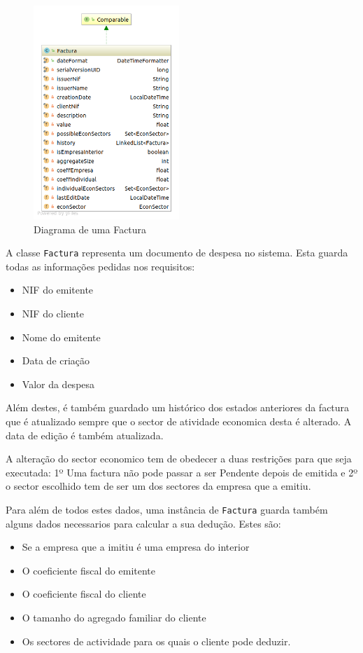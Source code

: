 \documentclass[12pt,a4paper]{report}
\begin{document}
    \begin{figure}
        \includegraphics[width=5.5cm]{./images/Factura.png}
        \caption{Diagrama de uma Factura}\label{fig:Factura}
    \end{figure}

    A classe \texttt{Factura} representa um documento de despesa no
    sistema. Esta guarda todas as informações pedidas nos requisitos:
    \begin{multicols}{2}
        \begin{itemize}
            \item NIF do emitente
            \item NIF do cliente
            \item Nome do emitente
            \item Data de criação
            \item Valor da despesa
        \end{itemize}
    \end{multicols}
    Além destes, é também guardado um histórico dos estados anteriores da factura
    que é atualizado sempre que o sector de atividade economica desta é
    alterado. A data de edição é também atualizada.

    A alteração do sector economico tem de obedecer a duas restrições para que
    seja executada: 1º Uma factura não pode passar a ser Pendente depois de
    emitida e 2º o sector escolhido tem de ser um dos sectores da empresa que a
    emitiu.

    Para além de todos estes dados, uma instância de \texttt{Factura}
    guarda também alguns dados necessarios para calcular a sua dedução. Estes são:
    \begin{itemize}
        \item Se a empresa que a imitiu é uma empresa do interior
        \item O coeficiente fiscal do emitente
        \item O coeficiente fiscal do cliente
        \item O tamanho do agregado familiar do cliente
        \item Os sectores de actividade para os quais o cliente
            pode deduzir.
    \end{itemize}
\end{document}
